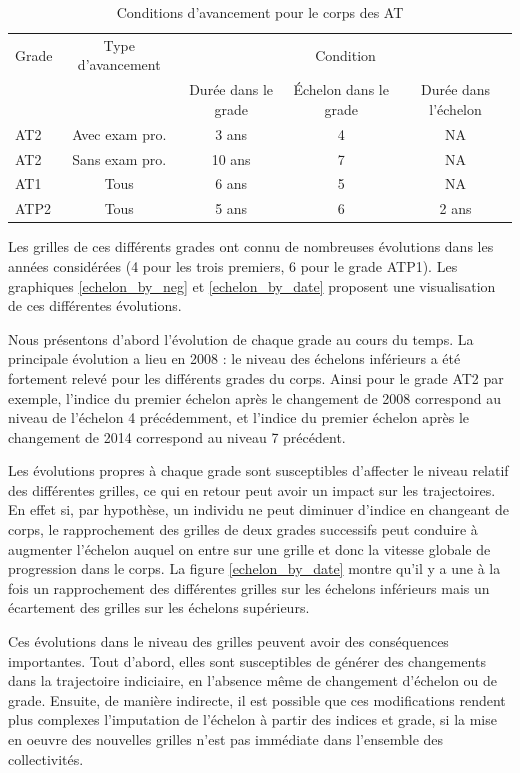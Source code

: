 \documentclass[11pt,a4paper]{article}
\begin{document}
\begin{table}[h!]
\label{means}
\centering
\caption{Conditions d'avancement pour le corps des AT} 
\begin{tabular}{l|c|ccc}
\toprule
 Grade  & Type d'avancement&  \multicolumn{3}{c}{Condition}  \\
		&  				   &  Durée dans le grade	&  Échelon	dans le grade & Durée dans l'échelon \\
\midrule
AT2  &	Avec exam pro. 	&   3 ans  & 	4  & NA \\
AT2  &	Sans exam pro. 	& 	10 ans &	7  &	NA \\
AT1  & Tous				& 	6 ans  &	5  &	NA \\
ATP2 & Tous				& 	5 ans  &	6  &	2 ans  \\	
%	
\bottomrule
\end{tabular}
\end{table}

Les grilles de ces différents grades ont connu de nombreuses évolutions dans les années considérées (4 pour les trois premiers, 6 pour le grade ATP1). Les graphiques \ref{echelon_by_neg} et \ref{echelon_by_date} proposent une visualisation de ces différentes évolutions. 

Nous présentons d'abord l'évolution de chaque grade au cours du temps. La principale évolution a lieu en 2008 : le niveau des échelons inférieurs a été fortement relevé pour les différents grades du corps. Ainsi pour le grade AT2 par exemple, l'indice du premier échelon après le changement de 2008 correspond au niveau de l'échelon 4 précédemment, et l'indice du premier échelon après le changement de 2014 correspond au niveau 7 précédent. 

Les évolutions propres à chaque grade sont susceptibles d'affecter le niveau relatif des différentes grilles, ce qui en retour peut avoir un impact sur les trajectoires. En effet si, par hypothèse, un individu ne peut diminuer d'indice en changeant de corps, le rapprochement des grilles de deux grades successifs peut conduire à augmenter l'échelon auquel on entre sur une grille et donc la vitesse globale de progression dans le corps. La figure \ref{echelon_by_date} montre qu'il y a une à la fois un rapprochement des différentes grilles sur les échelons inférieurs mais un écartement des grilles sur les échelons supérieurs. 

\medskip

Ces évolutions dans le niveau des grilles peuvent avoir des conséquences importantes. Tout d'abord, elles sont susceptibles de générer des changements dans la trajectoire indiciaire, en l'absence même de changement d'échelon ou de grade. Ensuite, de manière indirecte, il est possible que ces modifications rendent plus complexes l'imputation de l'échelon à partir des indices et grade, si la mise en oeuvre des nouvelles grilles n'est pas immédiate dans l'ensemble des collectivités. 
\end{document}
